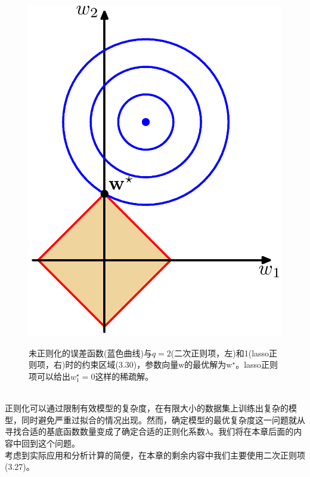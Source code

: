 \documentclass[b5paper]{book}
\numberwithin{equation}{chapter}
\newcommand {\bw} {\boldsymbol{\mathrm{w}}}
\begin{document}
{\begin{figure}[ht]
\begin{minipage}[t]{0.5\linewidth}
		\label{fig:3-4a}
		\end{minipage}
		\begin{minipage}[t]{0.5\linewidth}
		\centering
		\includegraphics[scale=0.8]{Images/3-4b.png}
		\label{fig:3-4b}
		\end{minipage}
		\caption{未正则化的误差函数(蓝色曲线)与$q=2$(二次正则项，左)和1(lasso正则项，右)时的约束区域(3.30)，参数向量$\bw$的最优解为$\bw^{\star}$。lasso正则项可以给出$w_1^{\star}=0$这样的稀疏解。}
	\end{figure}
	\\
	\indent 正则化可以通过限制有效模型的复杂度，在有限大小的数据集上训练出复杂的模型，同时避免严重过拟合的情况出现。然而，确定模型的最优复杂度这一问题就从寻找合适的基底函数数量变成了确定合适的正则化系数$\lambda$。我们将在本章后面的内容中回到这个问题。\\
	\indent 考虑到实际应用和分析计算的简便，在本章的剩余内容中我们主要使用二次正则项(3.27)。
	}
\end{document}
